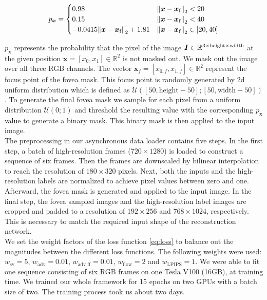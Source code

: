 \documentclass[10pt,twocolumn,letterpaper]{article}
\newcommand{\Vector}[1]{\boldsymbol{#1}}
\newcommand{\Matrix}[1]{\boldsymbol{\MakeUppercase{#1}}}
\newcommand{\Set}[1]{\mathbb{#1}}
\begin{document}
	\begin{equation}
	p_{\Vector{x}} = \begin{cases} 0.98 & \norm{\Vector{x} - \Vector{x}_{\text{f}}}_{2} < 20\\
	0.15 & \norm{\Vector{x} - \Vector{x}_{\text{f}}}_{2} < 40\\
	-0.0415 \norm{\Vector{x} - \Vector{x}_{\text{f}}}_{2} + 1.81 & \norm{\Vector{x} - \Vector{x}_{\text{f}}}_{2} \in \left[20, 40\right]
	\end{cases}
	\end{equation}
	
	$p_{\Vector{x}}$ represents the probability that the pixel of the image $\Matrix{I}\in\Set{R}^{3\times\text{height}\times\text{width}}$ at the given position $\Vector{x}=[x_{0}, x_{1}]\in\Set{R}^2$ is not masked out. We mask out the image over all three RGB channels. The vector $\Vector{x}_{f}=[x_{0,f}, x_{1,f}]\in\Set{R}^2$ represent the focus point of the fovea mask. This focus point is randomly generated by 2d uniform distribution which is defined as $\mathcal{U}\left(\left[50, \text{height} - 50\right]; \left[50, \text{width} - 50\right]\right)$. To generate the final fovea mask we sample for each pixel from a uniform distribution $\mathcal{U}\left(0; 1\right)$ and threshold the resulting value with the corresponding $p_{\Vector{x}}$ value to generate a binary mask. This binary mask is then applied to the input image.\\
	The preprocessing in our asynchronous data loader contains five steps. In the first step, a batch of high-resolution frames ($720 \times 1280$) is loaded to construct a sequence of six frames. Then the frames are downscaled by bilinear interpolation to reach the resolution of $180 \times 320$ pixels. Next, both the inputs and the high-resolution labels are normalized to achieve pixel values between zero and one. Afterward, the fovea mask is generated and applied to the input image. In the final step, the fovea sampled images and the high-resolution label images are cropped and padded to a resolution of $192 \times 256$ and $768 \times 1024$, respectively. This is necessary to match the required input shape of the reconstruction network.\\
	We set the weight factors of the loss function \ref{eq:loss} to balance out the magnitudes between the different loss functions. The following weights were used: $w_{\text{sv}}=5$, $w_{\text{adv}}=0.01$, $w_{\text{adv ff}}=0.01$, $w_{\text{flow}}=2$ and $w_{\text{LPIPS}}=1$.
	We were able to fit one sequence consisting of six RGB frames on one Tesla V100 (16GB), at training time. We trained our whole framework for 15 epochs on two GPUs with a batch size of two. The training process took us about two days.
	
\end{document}
